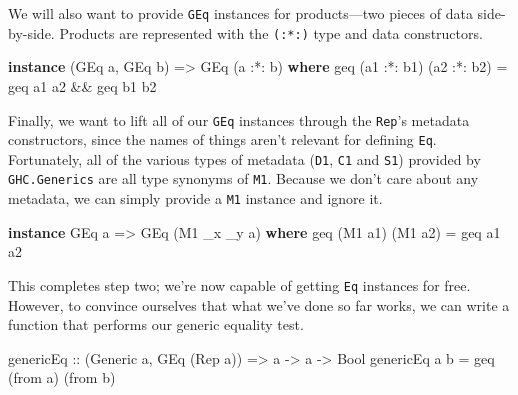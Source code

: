 \documentclass[
  11pt,
]{book}
\newenvironment{Shaded}{}{}
\newcommand{\DataTypeTok}[1]{\textcolor[rgb]{0.56,0.13,0.00}{#1}}
\newcommand{\KeywordTok}[1]{\textcolor[rgb]{0.00,0.44,0.13}{\textbf{#1}}}
\newcommand{\NormalTok}[1]{#1}
\newcommand{\OperatorTok}[1]{\textcolor[rgb]{0.40,0.40,0.40}{#1}}
\newcommand{\OtherTok}[1]{\textcolor[rgb]{0.00,0.44,0.13}{#1}}
\theoremstyle{nonumberplain}
\begin{document}
We will also want to provide \texttt{GEq} instances for products---two
pieces of data side-by-side. Products are represented with the
\texttt{(:*:)} type and data constructors.

\begin{Shaded}
\begin{Highlighting}[]
\KeywordTok{instance}\NormalTok{ (}\DataTypeTok{GEq}\NormalTok{ a, }\DataTypeTok{GEq}\NormalTok{ b) }\OtherTok{=\textgreater{}} \DataTypeTok{GEq}\NormalTok{ (a }\OperatorTok{:*:}\NormalTok{ b) }\KeywordTok{where}
\NormalTok{  geq (a1 }\OperatorTok{:*:}\NormalTok{ b1) (a2 }\OperatorTok{:*:}\NormalTok{ b2) }\OtherTok{=}\NormalTok{ geq a1 a2 }\OperatorTok{\&\&}\NormalTok{ geq b1 b2}
\end{Highlighting}
\end{Shaded}

Finally, we want to lift all of our \texttt{GEq} instances through the
\texttt{Rep}'s metadata constructors, since the names of things aren't
relevant for defining \texttt{Eq}. Fortunately, all of the various types
of metadata (\texttt{D1}, \texttt{C1} and \texttt{S1}) provided by
\texttt{GHC.Generics} are all type synonyms of \texttt{M1}. Because we
don't care about any metadata, we can simply provide a \texttt{M1}
instance and ignore it.

\begin{Shaded}
\begin{Highlighting}[]
\KeywordTok{instance} \DataTypeTok{GEq}\NormalTok{ a }\OtherTok{=\textgreater{}} \DataTypeTok{GEq}\NormalTok{ (}\DataTypeTok{M1}\NormalTok{ \_x \_y a) }\KeywordTok{where}
\NormalTok{  geq (}\DataTypeTok{M1}\NormalTok{ a1) (}\DataTypeTok{M1}\NormalTok{ a2) }\OtherTok{=}\NormalTok{ geq a1 a2}
\end{Highlighting}
\end{Shaded}

This completes step two; we're now capable of getting \texttt{Eq}
instances for free. However, to convince ourselves that what we've done
so far works, we can write a function that performs our generic equality
test.

\begin{Shaded}
\begin{Highlighting}[]
\OtherTok{genericEq ::}\NormalTok{ (}\DataTypeTok{Generic}\NormalTok{ a, }\DataTypeTok{GEq}\NormalTok{ (}\DataTypeTok{Rep}\NormalTok{ a)) }\OtherTok{=\textgreater{}}\NormalTok{ a }\OtherTok{{-}\textgreater{}}\NormalTok{ a }\OtherTok{{-}\textgreater{}} \DataTypeTok{Bool}
\NormalTok{genericEq a b }\OtherTok{=}\NormalTok{ geq (from a) (from b)}
\end{Highlighting}
\end{Shaded}
\end{document}
